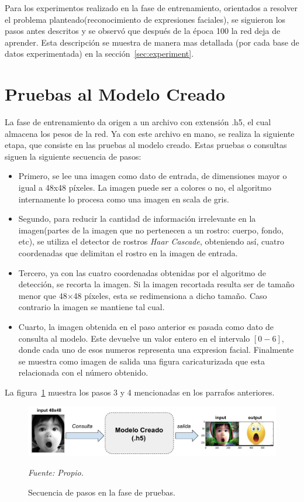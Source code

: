 Para los experimentos realizado en la fase de entrenamiento, orientados a resolver el problema planteado(reconocimiento de expresiones faciales), se siguieron los pasos antes descritos y se observó que después de la época 100 la red deja de aprender. Esta descripción se muestra de manera mas detallada (por cada base de datos experimentada) en la sección~\ref{sec:experiment}.

\section{Pruebas al Modelo Creado}

La fase de entrenamiento da origen a un archivo con extensión .h5, el cual almacena los pesos de la red. Ya con este archivo en mano, se realiza la siguiente etapa, que consiste en las pruebas al modelo creado. Estas pruebas o consultas siguen la siguiente secuencia de pasos: 

\begin{itemize}
\item Primero, se lee una imagen como dato de entrada, de dimensiones mayor o igual a 48x48 píxeles. La imagen puede ser a colores o no, el algoritmo internamente lo procesa como una imagen en scala de gris.
\item Segundo, para reducir la cantidad de información irrelevante en la imagen(partes de la imagen que no pertenecen a un rostro: cuerpo, fondo, etc), se utiliza el detector de rostros \textit{Haar Cascade}, obteniendo así, cuatro coordenadas que delimitan el rostro en la imagen de entrada.
\item Tercero, ya con las cuatro coordenadas obtenidas por el algoritmo de detección, se recorta la imagen. Si la imagen recortada resulta ser de tamaño menor que 48$\times$48 píxeles, esta se redimensiona a dicho tamaño. Caso contrario la imagen se mantiene tal cual.
\item Cuarto, la imagen obtenida en el paso anterior es pasada como dato de consulta al modelo. Este devuelve un valor entero en el intervalo $[0-6]$, donde cada uno de esos numeros representa una expresion facial. Finalmente se muestra como imagen de salida una figura caricaturizada que esta relacionada con el número obtenido.
\end{itemize}

La figura~\ref{fig:test} muestra los pasos 3 y 4 mencionadas en los parrafos anteriores.

\begin{figure}[H]
		\centering
		\includegraphics[width=160mm]{Imagenes/test.pdf}
		\caption{Secuencia de pasos en la fase de pruebas.}
		\vspace{0.15cm}
		\textit{Fuente: Propio.}
		\label{fig:test}
\end{figure}

